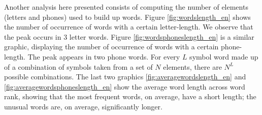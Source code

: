 Another analysis here presented consists of computing the number of elements (letters and phones) 
used to build up words. Figure \ref{fig:wordslength_en} shows the number of occurrence of words 
with a certain letter-length. We observe that the peak occurs in 3 letter words. 
Figure \ref{fig:wordsphoneslength_en} is a similar graphic, displaying the number of occurrence 
of words with a certain phone-length. The peak appears in two phone words. For every $L$ symbol 
word made up of a combination of symbols taken from a set of $N$ elements, there are $N^L$ possible 
combinations. 
The last two graphics \ref{fig:averagewordslength_en} and \ref{fig:averagewordsphoneslength_en} 
show the average word length across word rank, showing that the most frequent words, on average, 
have a short length; the unusual words are, on average, significantly longer.



